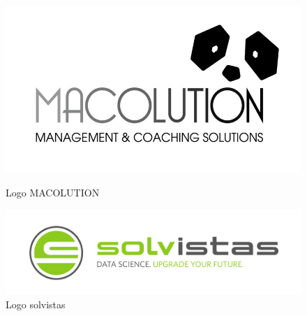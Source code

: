 \begin{figure}[H]
    \hspace{-2cm}
    \begin{minipage}{0.5\textwidth}
        \centering
        \includegraphics[height=0.4\textwidth]{./pics/Logo-Macolution.jpg}
        \caption{Logo MACOLUTION}
    \end{minipage}
    \begin{minipage}{0.5\textwidth}
        \centering
        \includegraphics[height=0.4\textwidth]{./pics/Logo-Solvistas.jpg}
        \caption{Logo solvistas}
    \end{minipage}
\end{figure}
